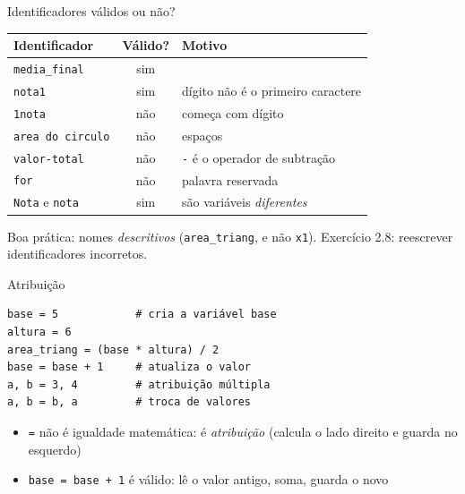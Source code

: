 \documentclass[aspectratio=169,10pt,t]{beamer}
\begin{document}
\begin{frame}{Identificadores válidos ou não?}
  \centering\small
  \begin{tabular}{lcl}
    \toprule
    Identificador & Válido? & Motivo\\
    \midrule
    \texttt{media\_final} & sim & \\
    \texttt{nota1} & sim & dígito não é o primeiro caractere\\
    \texttt{1nota} & \alert{não} & começa com dígito\\
    \texttt{area do circulo} & \alert{não} & espaços\\
    \texttt{valor-total} & \alert{não} & \texttt{-} é o operador de subtração\\
    \texttt{for} & \alert{não} & palavra reservada\\
    \texttt{Nota} e \texttt{nota} & sim & são variáveis \emph{diferentes}\\
    \bottomrule
  \end{tabular}
  \vspace{2ex}

  \footnotesize Boa prática: nomes \emph{descritivos} (\texttt{area\_triang}, e não \texttt{x1}). Exercício 2.8: reescrever identificadores incorretos.
\end{frame}

\begin{frame}[fragile]{Atribuição}
\begin{lstlisting}
base = 5            # cria a variável base
altura = 6
area_triang = (base * altura) / 2
base = base + 1     # atualiza o valor
a, b = 3, 4         # atribuição múltipla
a, b = b, a         # troca de valores
\end{lstlisting}
  \begin{itemize}
    \item \texttt{=} \alert{não é igualdade} matemática: é \emph{atribuição} (calcula o lado direito e guarda no esquerdo)
    \item \texttt{base = base + 1} é válido: lê o valor antigo, soma, guarda o novo
  \end{itemize}
\end{frame}
\end{document}
